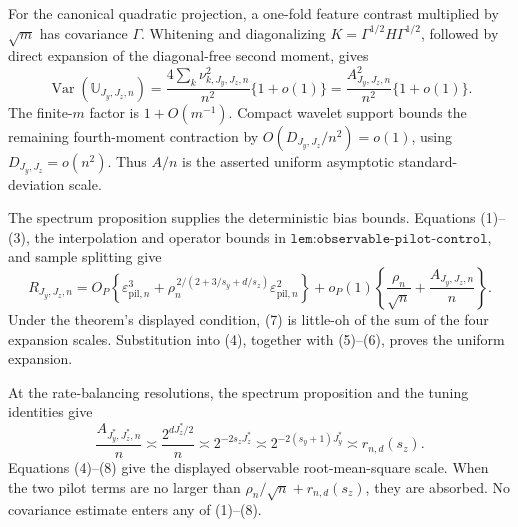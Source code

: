 For the canonical quadratic projection, a one-fold feature contrast multiplied by \(\sqrt m\) has covariance \(\Gamma\). Whitening and diagonalizing \(K=\Gamma^{1/2}H\Gamma^{1/2}\), followed by direct expansion of the diagonal-free second moment, gives
\[
\operatorname{Var}(\mathbb U_{J_y,J_z,n})
=\frac{4\sum_k\nu_{k,J_y,J_z,n}^2}{n^2}\{1+o(1)\}
=\frac{A_{J_y,J_z,n}^2}{n^2}\{1+o(1)\}.              \tag{6}
\]
The finite-\(m\) factor is \(1+O(m^{-1})\). Compact wavelet support bounds the remaining fourth-moment contraction by \(O(D_{J_y,J_z}/n^2)=o(1)\), using \(D_{J_y,J_z}=o(n^2)\). Thus \(A/n\) is the asserted uniform asymptotic standard-deviation scale.

The spectrum proposition supplies the deterministic bias bounds. Equations (1)--(3), the interpolation and operator bounds in \(\texttt{lem:observable-pilot-control}\), and sample splitting give
\[
R_{J_y,J_z,n}
=O_P\!\left\{\varepsilon_{\mathrm{pil},n}^3+
\rho_n^{\,2/(2+3/s_y+d/s_z)}\varepsilon_{\mathrm{pil},n}^2\right\}
+o_P(1)\left\{\frac{\rho_n}{\sqrt n}+
\frac{A_{J_y,J_z,n}}n\right\}.                       \tag{7}
\]
Under the theorem's displayed condition, (7) is little-oh of the sum of the four expansion scales. Substitution into (4), together with (5)--(6), proves the uniform expansion.

At the rate-balancing resolutions, the spectrum proposition and the tuning identities give
\[
\frac{A_{J_y^*,J_z^*,n}}n
\asymp\frac{2^{dJ_z^*/2}}n
\asymp2^{-2s_zJ_z^*}
\asymp2^{-2(s_y+1)J_y^*}
\asymp r_{n,d}(s_z).                                  \tag{8}
\]
Equations (4)--(8) give the displayed observable root-mean-square scale. When the two pilot terms are no larger than \(\rho_n/\sqrt n+r_{n,d}(s_z)\), they are absorbed. No covariance estimate enters any of (1)--(8).